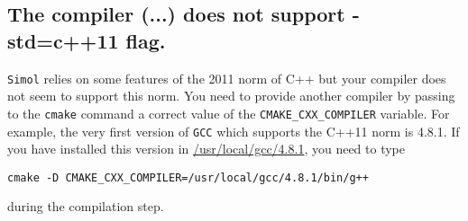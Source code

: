 \documentclass[12pt]{book}
\newcommand{\Simol}{\texttt{Simol}\xspace}
\begin{document}
\subsection{The compiler (...) does not support -std=c++11 flag.}

\Simol relies on some features of the 2011 norm of C++ but your compiler does not seem to support this norm. You need to provide another compiler by passing to the \texttt{cmake} command a correct value of the \texttt{CMAKE\_CXX\_COMPILER} variable. For example, the very first version of \texttt{GCC} which supports the C++11 norm is 4.8.1. If you have installed this version in \url{/usr/local/gcc/4.8.1}, you need to type
\lstset{language=bash} 
\begin{lstlisting}
cmake -D CMAKE_CXX_COMPILER=/usr/local/gcc/4.8.1/bin/g++
\end{lstlisting}
during the compilation step.
\end{document}
